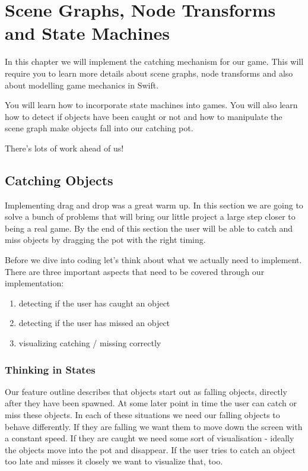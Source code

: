 \chapter{Scene Graphs, Node Transforms and State Machines}
In this chapter we will implement the catching mechanism for our game. This will
require you to learn more details about scene graphs, node transforms and also about modelling game mechanics in Swift.

You will learn how to incorporate state machines into games. You will also learn
how to detect if objects have been caught or not and how to manipulate the
scene graph make objects fall into our catching pot.

There's lots of work ahead of us!

\section{Catching Objects}
Implementing drag and drop was a great warm up. In this section we are going to
solve a bunch of problems that will bring our little project a large step closer
to being a real game. By the end of this section the user will be able to catch
and miss objects by dragging the pot with the right timing.

Before we dive into coding let's think about what we actually need to implement.
There are three important aspects that need to be covered through our
implementation:
\begin{enumerate}
  \item detecting if the user has caught an object
  \item detecting if the user has missed an object
  \item visualizing catching / missing correctly
\end{enumerate}

\subsection{Thinking in States}
Our feature outline describes that objects start out as falling objects,
directly after they have been spawned. At some later point in time the user can
catch or miss these objects. In each of these situations we need our falling objects to behave differently. If they are
falling we want them to move down the screen with a constant speed. If they are
caught we need some sort of visualisation - ideally the objects move into the
pot and disappear. If the user tries to catch an object too late and misses it
closely we want to visualize that, too.

